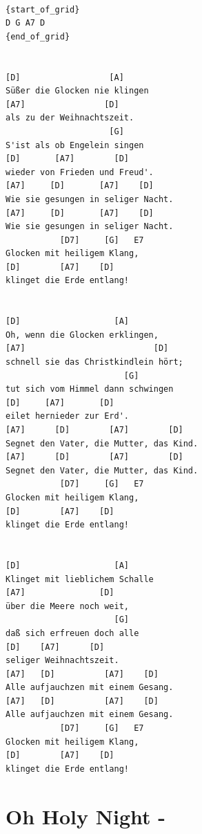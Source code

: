 \documentclass[]{book}
\let\stdsection\section
\renewcommand\section{\clearpage\stdsection}
\begin{document}
\begin{verbatim}

{start_of_grid}
D G A7 D 
{end_of_grid}


[D]                  [A]
Süßer die Glocken nie klingen
[A7]                [D]
als zu der Weihnachtszeit.
                     [G]
S'ist als ob Engelein singen
[D]       [A7]        [D]
wieder von Frieden und Freud'.
[A7]     [D]       [A7]    [D]
Wie sie gesungen in seliger Nacht.
[A7]     [D]       [A7]    [D]
Wie sie gesungen in seliger Nacht.
           [D7]     [G]   E7
Glocken mit heiligem Klang,
[D]        [A7]    [D]
klinget die Erde entlang!

 
[D]                   [A]
Oh, wenn die Glocken erklingen,
[A7]                          [D]
schnell sie das Christkindlein hört;
                        [G]
tut sich vom Himmel dann schwingen
[D]     [A7]       [D]
eilet hernieder zur Erd'.
[A7]      [D]        [A7]        [D]
Segnet den Vater, die Mutter, das Kind.
[A7]      [D]        [A7]        [D]
Segnet den Vater, die Mutter, das Kind.
           [D7]     [G]   E7
Glocken mit heiligem Klang,
[D]        [A7]    [D]
klinget die Erde entlang!


[D]                   [A]
Klinget mit lieblichem Schalle
[A7]               [D]
über die Meere noch weit,
                      [G]
daß sich erfreuen doch alle
[D]    [A7]      [D]
seliger Weihnachtszeit.
[A7]   [D]          [A7]    [D]
Alle aufjauchzen mit einem Gesang.
[A7]   [D]          [A7]    [D]
Alle aufjauchzen mit einem Gesang.
           [D7]     [G]   E7
Glocken mit heiligem Klang,
[D]        [A7]    [D]
klinget die Erde entlang!
\end{verbatim}

\hypertarget{oh-holy-night--}{%
\section{Oh Holy Night -}\label{oh-holy-night--}}
\end{document}
